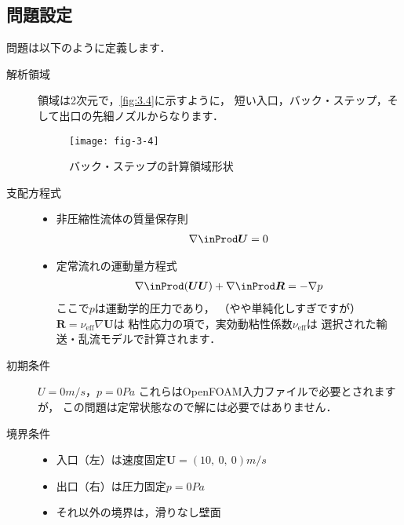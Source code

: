 \subsection{問題設定}
\label{ssec:3.2.1}
問題は以下のように定義します．
\begin{description}
 \item[解析領域] 領域は2次元で，\autoref{fig:3.4}に示すように，
            短い入口，バック・ステップ，そして出口の先細ノズルからなります．


\begin{figure}[ht]
 \texttt{[image: fig-3-4]}
 \caption{バック・ステップの計算領域形状}
 \label{fig:3.4}
\end{figure}


 \item[支配方程式] \mbox{}
            \begin{itemize}
             \item 非圧縮性流体の質量保存則
                   \begin{align}
                    \label{eq:3.3}
                    \nabla \inProd \bm{U} = 0
                   \end{align}
             \item 定常流れの運動量方程式
                   \begin{align}
                    \label{eq:3.4}
                    \nabla \inProd (\bm{U}\bm{U}) + \nabla \inProd \bm{R} = -\nabla p
                   \end{align}
                   ここで$p$は運動学的圧力であり，
                   （やや単純化しすぎですが）$\bm{R} = \nu_{\mathrm{eff}}\nabla\bm{U}$は
                   粘性応力の項で，実効動粘性係数$\nu_{\mathrm{eff}}$は
                   選択された輸送・乱流モデルで計算されます．
            \end{itemize}
 \item[初期条件] $U = 0 \unit{m/s}$，$p = 0 \unit{Pa}$\jdash
            これらはOpenFOAM入力ファイルで必要とされますが，
            この問題は定常状態なので解には必要ではありません．
 \item[境界条件] \mbox{}
            \begin{itemize}
             \item 入口（左）は速度固定$\bm{U} = (10,\ 0,\ 0) \unit{m/s}$
             \item 出口（右）は圧力固定$p = 0 \unit{Pa}$
             \item それ以外の境界は，滑りなし壁面

\end{itemize}
\end{description}
